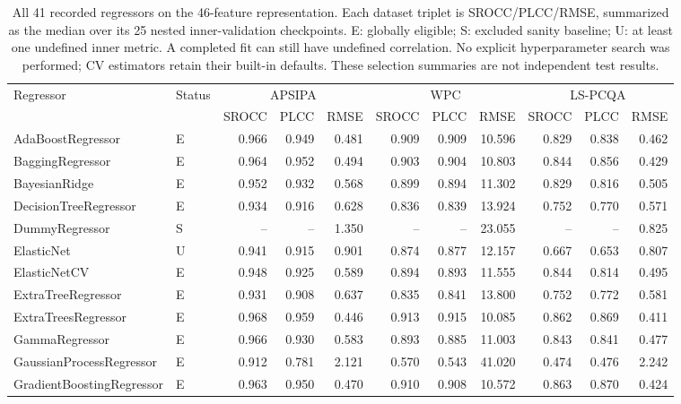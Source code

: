 \begin{table}[t!]
\centering
\caption{All 41 recorded regressors on the 46-feature representation. Each dataset triplet is SROCC/PLCC/RMSE, summarized as the median over its 25 nested inner-validation checkpoints. E: globally eligible; S: excluded sanity baseline; U: at least one undefined inner metric. A completed fit can still have undefined correlation. No explicit hyperparameter search was performed; CV estimators retain their built-in defaults. These selection summaries are not independent test results.}
\label{tab_review_regressors}
\scriptsize
\begin{adjustbox}{max width=\textwidth}
\begin{tabular}{llrrrrrrrrr}
\toprule
Regressor & Status & \multicolumn{3}{c}{APSIPA} & \multicolumn{3}{c}{WPC} & \multicolumn{3}{c}{LS-PCQA} \\
 & & SROCC & PLCC & RMSE & SROCC & PLCC & RMSE & SROCC & PLCC & RMSE \\
\midrule
AdaBoostRegressor & E & 0.966 & 0.949 & 0.481 & 0.909 & 0.909 & 10.596 & 0.829 & 0.838 & 0.462 \\
BaggingRegressor & E & 0.964 & 0.952 & 0.494 & 0.903 & 0.904 & 10.803 & 0.844 & 0.856 & 0.429 \\
BayesianRidge & E & 0.952 & 0.932 & 0.568 & 0.899 & 0.894 & 11.302 & 0.829 & 0.816 & 0.505 \\
DecisionTreeRegressor & E & 0.934 & 0.916 & 0.628 & 0.836 & 0.839 & 13.924 & 0.752 & 0.770 & 0.571 \\
DummyRegressor & S & -- & -- & 1.350 & -- & -- & 23.055 & -- & -- & 0.825 \\
ElasticNet & U & 0.941 & 0.915 & 0.901 & 0.874 & 0.877 & 12.157 & 0.667 & 0.653 & 0.807 \\
ElasticNetCV & E & 0.948 & 0.925 & 0.589 & 0.894 & 0.893 & 11.555 & 0.844 & 0.814 & 0.495 \\
ExtraTreeRegressor & E & 0.931 & 0.908 & 0.637 & 0.835 & 0.841 & 13.800 & 0.752 & 0.772 & 0.581 \\
ExtraTreesRegressor & E & 0.968 & 0.959 & 0.446 & 0.913 & 0.915 & 10.085 & 0.862 & 0.869 & 0.411 \\
GammaRegressor & E & 0.966 & 0.930 & 0.583 & 0.893 & 0.885 & 11.003 & 0.843 & 0.841 & 0.477 \\
GaussianProcessRegressor & E & 0.912 & 0.781 & 2.121 & 0.570 & 0.543 & 41.020 & 0.474 & 0.476 & 2.242 \\
GradientBoostingRegressor & E & 0.963 & 0.950 & 0.470 & 0.910 & 0.908 & 10.572 & 0.863 & 0.870 & 0.424 \\

\end{tabular}
\end{adjustbox}
\end{table}
